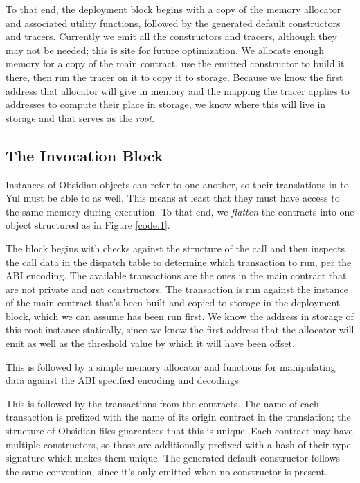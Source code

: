 To that end, the deployment block begins with a copy of the memory
allocator and associated utility functions, followed by the generated
default constructors and tracers. Currently we emit all the constructors
and tracers, although they may not be needed; this is site for future
optimization. We allocate enough memory for a copy of the main contract,
use the emitted constructor to build it there, then run the tracer on it to
copy it to storage. Because we know the first address that allocator will
give in memory and the mapping the tracer applies to addresses to compute
their place in storage, we know where this will live in storage and that
serves as the \emph{root}.

\subsection{The Invocation Block}

Instances of Obsidian objects can refer to one another, so their
translations in to Yul must be able to as well. This means at least that
they must have access to the same memory during execution. To that end, we
\emph{flatten} the contracts into one object structured as in Figure
\ref{code.1}.

The block begins with checks against the structure of the call and then
inspects the call data in the dispatch table to determine which transaction
to run, per the ABI encoding. The available transactions are the ones in
the main contract that are not private and not constructors. The
transaction is run against the instance of the main contract that's been
built and copied to storage in the deployment block, which we can assume
has been run first. We know the address in storage of this root instance
statically, since we know the first address that the allocator will emit as
well as the threshold value by which it will have been offset.

This is followed by a simple memory allocator and functions for
manipulating data against the ABI specified encoding and decodings.

This is followed by the transactions from the contracts. The name of each
transaction is prefixed with the name of its origin contract in the
translation; the structure of Obsidian files guarantees that this is
unique. Each contract may have multiple constructors, so those are
additionally prefixed with a hash of their type signature which makes them
unique. The generated default constructor follows the same convention,
since it's only emitted when no constructor is present.

